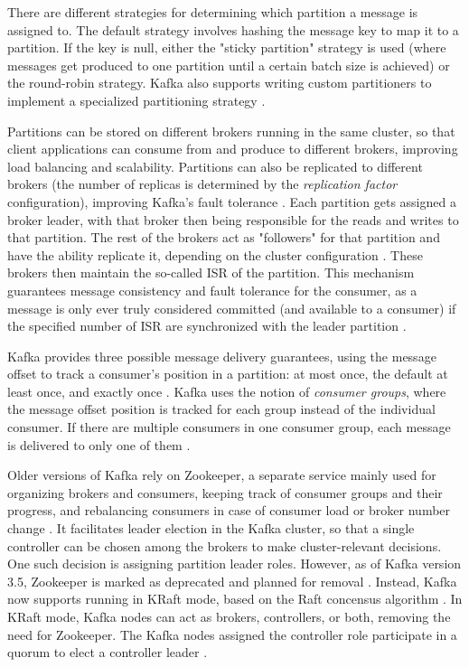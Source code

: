There are different strategies for determining which partition a message is assigned to. The default strategy involves hashing the message key to map it to a partition. If the key is null, either the "sticky partition" strategy is used (where messages get produced to one partition until a certain batch size is achieved) or the round-robin strategy. Kafka also supports writing custom partitioners to implement a specialized partitioning strategy  \cite{kafkadocumentation}.

Partitions can be stored on different brokers running in the same cluster, so that client applications can consume from and produce to different brokers, improving load balancing and scalability. Partitions can also be replicated to different brokers (the number of replicas is determined by the \textit{replication factor} configuration), improving Kafka's fault tolerance \cite{thein2014apache}. Each partition gets assigned a broker leader, with that broker then being responsible for the reads and writes to that partition. The rest of the brokers act as "followers" for that partition and have the ability replicate it, depending on the cluster configuration \cite{petrescukafkaraft}. These brokers then maintain the so-called \ac{ISR} of the partition. This mechanism guarantees message consistency and fault tolerance for the consumer, as a message is only ever truly considered committed (and available to a consumer) if the specified number of \ac{ISR} are synchronized with the leader partition \cite{kafkadocumentation}.

Kafka provides three possible message delivery guarantees, using the message offset to track a consumer's position in a partition: at most once, the default at least once, and exactly once \cite{kafkadocumentation}. Kafka uses the notion of \textit{consumer groups}, where the message offset position is tracked for each group instead of the individual consumer. If there are multiple consumers in one consumer group, each message is delivered to only one of them \cite{kreps2011kafka}.

Older versions of Kafka rely on Zookeeper, a separate service mainly used for organizing brokers and consumers, keeping track of consumer groups and their progress, and rebalancing consumers in case of consumer load or broker number change \cite{kreps2011kafka}. It facilitates leader election in the Kafka cluster, so that a single controller can be chosen among the brokers to make cluster-relevant decisions. One such decision is assigning partition leader roles. However, as of Kafka version 3.5, Zookeeper is marked as deprecated and planned for removal \cite{kafkadocumentation}. Instead, Kafka now supports running in KRaft mode, based on the Raft concensus algorithm \cite{ongaroraft2014search}. In KRaft mode, Kafka nodes can act as brokers, controllers, or both, removing the need for Zookeeper. The Kafka nodes assigned the controller role participate in a quorum to elect a controller leader \cite{kafkadocumentation}.

